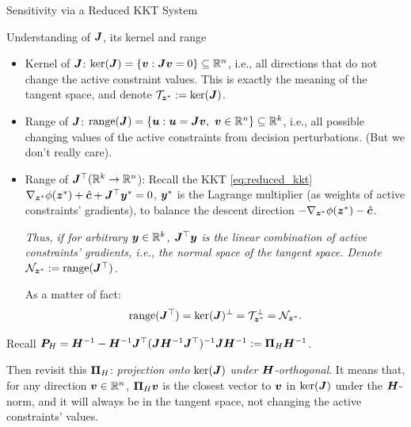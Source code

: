 \documentclass[10pt,aspectratio=169,xcolor=dvipsnames]{beamer}
\begin{document}
\begin{frame}[allowframebreaks]{Sensitivity via a Reduced KKT System}
    \begin{block}{\small Understanding of ${\bm{J}}$, its kernel and range}
        \begin{itemize}
            \item Kernel of ${\bm{J}}$: $\ker({\bm{J}}) = \{{\bm{v}} : {\bm{J}} {\bm{v}} = 0\} \subseteq \mathbb{R}^n$, i.e., all directions that do not change the active constraint values. This is exactly the meaning of the tangent space, and denote $\mathcal{T}_{{\bm{z}}^*} := \ker({\bm{J}})$.
            \item Range of ${\bm{J}}$: $\operatorname{range}({\bm{J}}) = \{{\bm{u}} : {\bm{u}} = {\bm{J}} {\bm{v}},~{\bm{v}} \in \mathbb{R}^n\} \subseteq \mathbb{R}^k$, i.e., all possible changing values of the active constraints from decision perturbations. (But we don't really care).
            \item Range of ${\bm{J}}^\top (\mathbb{R}^k \to \mathbb{R}^n$): Recall the KKT \eqref{eq:reduced_kkt} $\nabla_{{\bm{z}}^*} \phi({\bm{z}}^*) + \hat{{\bm{c}}} + {\bm{J}}^\top {\bm{y}}^* = 0$, ${\bm{y}}^*$ is the Lagrange multiplier (as weights of active constraints' gradients), to balance the descent direction $-\nabla_{{\bm{z}}^*} \phi({\bm{z}}^*) - \hat{{\bm{c}}}$.

            \emph{Thus, if for arbitrary ${\bm{y}} \in \mathbb{R}^k$, ${\bm{J}}^\top {\bm{y}}$ is the linear combination of active constraints' gradients, i.e., the normal space of the tangent space. Denote $\mathcal{N}_{{\bm{z}}^*} := \operatorname{range}({\bm{J}}^\top)$.}

            As a matter of fact:
            \begin{equation}
                \operatorname{range}({\bm{J}}^\top) = \ker({\bm{J}})^\perp = \mathcal{T}_{{\bm{z}}^*}^\perp = \mathcal{N}_{{\bm{z}}^*}.
            \end{equation}
        \end{itemize}
    \end{block}

    \break

    Recall ${\bm{P}}_H = {\bm{H}}^{-1} - {\bm{H}}^{-1} {\bm{J}}^\top ({\bm{J}} {\bm{H}}^{-1} {\bm{J}}^\top)^{-1} {\bm{J}} {\bm{H}}^{-1} := {\bm{\Pi}}_H {\bm{H}}^{-1}$.

    \vspace{1em}

    Then revisit this ${\bm{\Pi}}_H$: \emph{projection onto $\ker({\bm{J}})$ under ${\bm{H}}$-orthogonal}. It means that, for any direction ${\bm{v}} \in \mathbb{R}^n$, ${\bm{\Pi}}_H {\bm{v}}$ is the closest vector to ${\bm{v}}$ in $\ker({\bm{J}})$ under the ${\bm{H}}$-norm, and it will always be in the tangent space, not changing the active constraints' values.

    \break


\end{frame}
\end{document}
